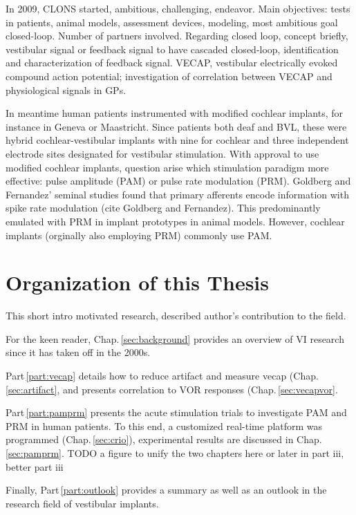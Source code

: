 In 2009, CLONS started, ambitious, challenging, endeavor. Main objectives: tests in patients, animal models, assessment devices, modeling, most ambitious goal closed-loop. Number of partners involved. Regarding closed loop, concept briefly, vestibular signal or feedback signal to have cascaded closed-loop, identification and characterization of feedback signal. VECAP, vestibular electrically evoked compound action potential; investigation of correlation between VECAP and physiological signals in GPs.

In meantime human patients instrumented with modified cochlear implants, for instance in Geneva or Maastricht. Since patients both deaf and BVL, these were hybrid cochlear-vestibular implants with nine for cochlear and three independent electrode sites designated for vestibular stimulation. With approval to use modified cochlear implants, question arise which stimulation paradigm more effective: pulse amplitude (PAM) or pulse rate modulation (PRM). Goldberg and Fernandez' seminal studies found that primary afferents encode information with spike rate modulation (cite Goldberg and Fernandez). This predominantly emulated with PRM in implant prototypes in animal models. However, cochlear implants (orginally also employing PRM) commonly use PAM. 

\section*{Organization of this Thesis}
This short intro motivated research, described author's contribution to the field.

For the keen reader, Chap.\,\ref{sec:background} provides an overview of VI research since it has taken off in the 2000s.  

Part\,\ref{part:vecap} details how to reduce artifact and measure vecap (Chap.\,\ref{sec:artifact}, and presents correlation to VOR responses (Chap.\,\ref{sec:vecapvor}.

Part\,\ref{part:pamprm} presents the acute stimulation trials to investigate PAM and PRM in human patients. To this end, a customized real-time platform was programmed (Chap.\,\ref{sec:crio}), experimental results are discussed in Chap.\,\ref{sec:pamprm}.
TODO a figure to unify the two chapters here or later in part iii, better part iii

Finally, Part\,\ref{part:outlook} provides a summary as well as an outlook in the research field of vestibular implants.